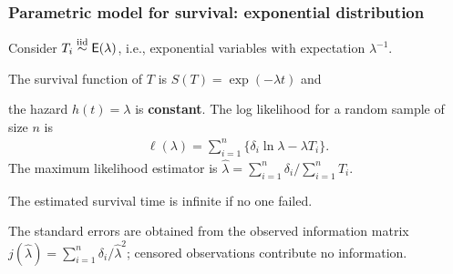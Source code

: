 \documentclass{beamer}
\begin{document}
\begin{frame}
\frametitle{Parametric model for survival: exponential distribution}
Consider $T_i \stackrel{\textnormal{iid}}{\sim} \mathsf{E}(\lambda)$, i.e., exponential variables with expectation $\lambda^{-1}$.
\bi \item 
The survival function of  $T$ is $S(T) = \exp(-\lambda t)$ and
\item the hazard $h(t)=\lambda$ is \textbf{constant}.
\ei
The log likelihood for a random sample of size $n$ is
\begin{align*}
\ell(\lambda) =\sum_{i=1}^n \{\delta_i \ln \lambda - \lambda T_i\}.
\end{align*}
The maximum likelihood estimator is $\widehat{\lambda} =\sum_{i=1}^n \delta_i/ \sum_{i=1}^n T_i $. 

\bi \item The estimated survival time is infinite if no one failed.
\item The standard errors are obtained from the observed information matrix $j(\widehat{\lambda}) = \sum_{i=1}^n \delta_i/\widehat{\lambda}^2$; censored observations contribute no information.
\ei

\end{frame}
\end{document}
